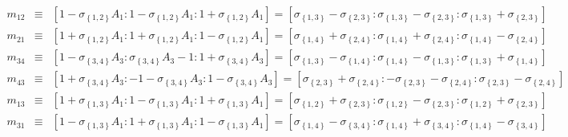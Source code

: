 \documentclass[11pt]{article}
\begin{document}
\begin{eqnarray*}
m_{12} &\equiv &\left[ 1-\sigma _{\left\{ 1,2\right\} }A_{1}:1-\sigma
_{\left\{ 1,2\right\} }A_{1}:1+\sigma _{\left\{ 1,2\right\} }A_{1}\right] =%
\left[ \sigma _{\left\{ 1,3\right\} }-\sigma _{\left\{ 2,3\right\} }:\sigma
_{\left\{ 1,3\right\} }-\sigma _{\left\{ 2,3\right\} }:\sigma _{\left\{
1,3\right\} }+\sigma _{\left\{ 2,3\right\} }\right] \\
m_{21} &\equiv &\left[ 1+\sigma _{\left\{ 1,2\right\} }A_{1}:1+\sigma
_{\left\{ 1,2\right\} }A_{1}:1-\sigma _{\left\{ 1,2\right\} }A_{1}\right] =%
\left[ \sigma _{\left\{ 1,4\right\} }+\sigma _{\left\{ 2,4\right\} }:\sigma
_{\left\{ 1,4\right\} }+\sigma _{\left\{ 2,4\right\} }:\sigma _{\left\{
1,4\right\} }-\sigma _{\left\{ 2,4\right\} }\right] \\
m_{34} &\equiv &\left[ 1-\sigma _{\left\{ 3,4\right\} }A_{3}:\sigma
_{\left\{ 3,4\right\} }A_{3}-1:1+\sigma _{\left\{ 3,4\right\} }A_{3}\right] =%
\left[ \sigma _{\left\{ 1,3\right\} }-\sigma _{\left\{ 1,4\right\} }:\sigma
_{\left\{ 1,4\right\} }-\sigma _{\left\{ 1,3\right\} }:\sigma _{\left\{
1,3\right\} }+\sigma _{\left\{ 1,4\right\} }\right] \\
m_{43} &\equiv &\left[ 1+\sigma _{\left\{ 3,4\right\} }A_{3}:-1-\sigma
_{\left\{ 3,4\right\} }A_{3}:1-\sigma _{\left\{ 3,4\right\} }A_{3}\right] =%
\left[ \sigma _{\left\{ 2,3\right\} }+\sigma _{\left\{ 2,4\right\} }:-\sigma
_{\left\{ 2,3\right\} }-\sigma _{\left\{ 2,4\right\} }:\sigma _{\left\{
2,3\right\} }-\sigma _{\left\{ 2,4\right\} }\right] \\
m_{13} &\equiv &\left[ 1+\sigma _{\left\{ 1,3\right\} }A_{1}:1-\sigma
_{\left\{ 1,3\right\} }A_{1}:1+\sigma _{\left\{ 1,3\right\} }A_{1}\right] =%
\left[ \sigma _{\left\{ 1,2\right\} }+\sigma _{\left\{ 2,3\right\} }:\sigma
_{\left\{ 1,2\right\} }-\sigma _{\left\{ 2,3\right\} }:\sigma _{\left\{
1,2\right\} }+\sigma _{\left\{ 2,3\right\} }\right] \\
m_{31} &\equiv &\left[ 1-\sigma _{\left\{ 1,3\right\} }A_{1}:1+\sigma
_{\left\{ 1,3\right\} }A_{1}:1-\sigma _{\left\{ 1,3\right\} }A_{1}\right] =%
\left[ \sigma _{\left\{ 1,4\right\} }-\sigma _{\left\{ 3,4\right\} }:\sigma
_{\left\{ 1,4\right\} }+\sigma _{\left\{ 3,4\right\} }:\sigma _{\left\{
1,4\right\} }-\sigma _{\left\{ 3,4\right\} }\right]
\end{eqnarray*}
\end{document}
